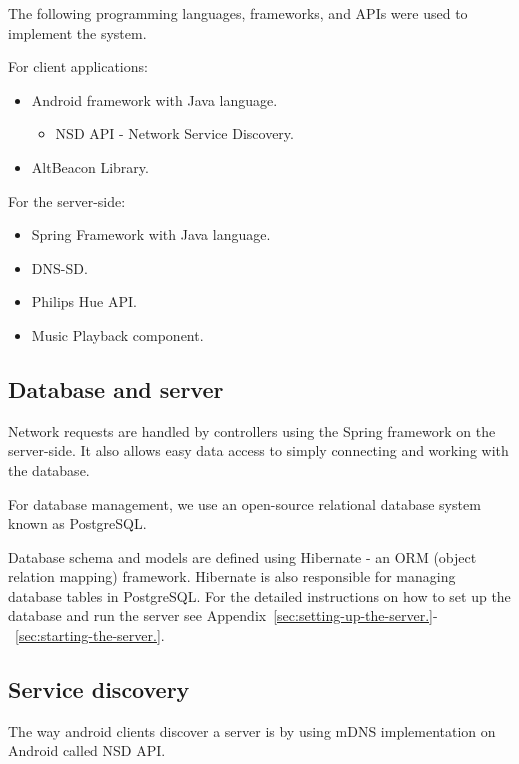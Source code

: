 The following programming languages, frameworks, and APIs were used to implement the system.

For client applications:
\begin{itemize}
    \item Android framework with Java language.
    \begin{itemize}
        \item NSD API - Network Service Discovery.
    \end{itemize}
    \item AltBeacon Library.
\end{itemize}

For the server-side:
\begin{itemize}
    \item Spring Framework with Java language.
    \item DNS-SD\@.
    \item Philips Hue API\@.
    \item Music Playback component.
\end{itemize}

\subsection{Database and server}
\label{subsec:database-and-server}
Network requests are handled by controllers using the Spring framework on the server-side.
It also allows easy data access to simply connecting and working with the database.

For database management, we use an open-source relational database system known as PostgreSQL\@.

Database schema and models are defined using Hibernate - an ORM (object relation mapping) framework.
Hibernate is also responsible for managing database tables in PostgreSQL\@.
For the detailed instructions on how to set up the database and run the server
see Appendix~\ref{sec:setting-up-the-server.}-~\ref{sec:starting-the-server.}.

\subsection{Service discovery}
\label{subsec:service-discovery.}
The way android clients discover a server is by using mDNS implementation on Android called NSD API\@.

